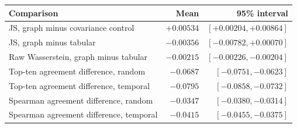 \begin{tabular}{lrr}
\toprule
Comparison & Mean & 95\% interval\\
\midrule
JS, graph minus covariance control & $+0.00534$ & $[+0.00204,+0.00864]$\\
JS, graph minus tabular & $-0.00356$ & $[-0.00782,+0.00070]$\\
Raw Wasserstein, graph minus tabular & $-0.00215$ & $[-0.00226,-0.00204]$\\
Top-ten agreement difference, random & $-0.0687$ & $[-0.0751,-0.0623]$\\
Top-ten agreement difference, temporal & $-0.0795$ & $[-0.0858,-0.0732]$\\
Spearman agreement difference, random & $-0.0347$ & $[-0.0380,-0.0314]$\\
Spearman agreement difference, temporal & $-0.0415$ & $[-0.0455,-0.0375]$\\
\bottomrule
\end{tabular}

